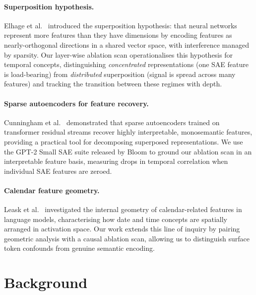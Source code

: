 \documentclass[11pt]{article}
\begin{document}
\paragraph{Superposition hypothesis.}
Elhage et al.\ \cite{elhage2022superposition} introduced the superposition hypothesis: that neural networks represent more features than they have dimensions by encoding features as nearly-orthogonal directions in a shared vector space, with interference managed by sparsity. Our layer-wise ablation scan operationalises this hypothesis for temporal concepts, distinguishing \emph{concentrated} representations (one SAE feature is load-bearing) from \emph{distributed} superposition (signal is spread across many features) and tracking the transition between these regimes with depth.

\paragraph{Sparse autoencoders for feature recovery.}
Cunningham et al.\ \cite{cunningham2024sparse} demonstrated that sparse autoencoders trained on transformer residual streams recover highly interpretable, monosemantic features, providing a practical tool for decomposing superposed representations. We use the GPT-2 Small SAE suite released by Bloom \cite{bloom2024gpt2saes} to ground our ablation scan in an interpretable feature basis, measuring drops in temporal correlation when individual SAE features are zeroed.

\paragraph{Calendar feature geometry.}
Leask et al.\ \cite{leask2024calendar} investigated the internal geometry of calendar-related features in language models, characterising how date and time concepts are spatially arranged in activation space. Our work extends this line of inquiry by pairing geometric analysis with a causal ablation scan, allowing us to distinguish surface token confounds from genuine semantic encoding.


\section{Background}
\end{document}
